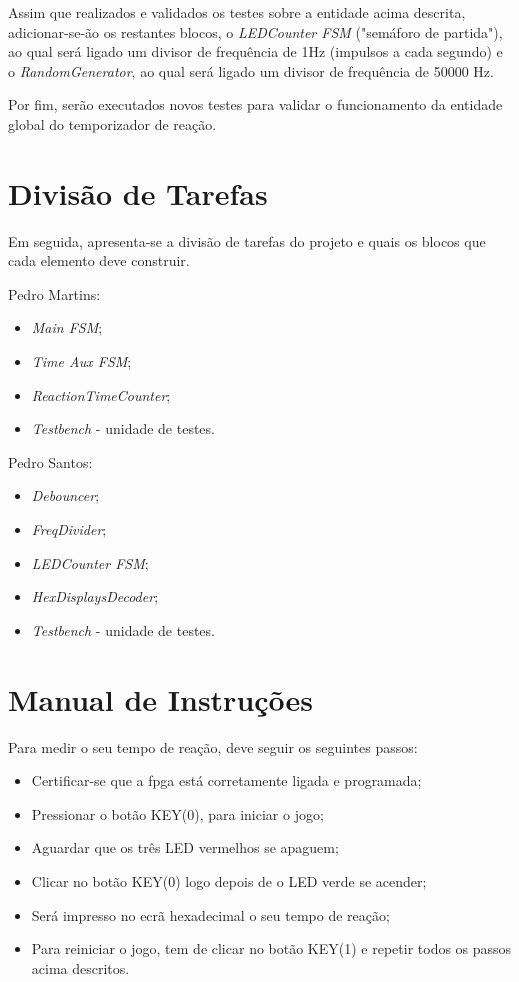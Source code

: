 \documentclass[a4paper,11pt,onecolumn]{report}
\begin{document}
Assim que realizados e validados os testes sobre a entidade acima descrita, adicionar-se-ão os restantes blocos, o \textit{LEDCounter FSM} ("semáforo de partida"), ao qual será ligado um divisor de frequência de 1Hz (impulsos a cada segundo) e o \textit{RandomGenerator}, ao qual será ligado um divisor de frequência de 50000 Hz.

Por fim, serão executados novos testes para validar o funcionamento da entidade global do temporizador de reação.

\section{Divisão de Tarefas}
Em seguida, apresenta-se a divisão de tarefas do projeto e quais os blocos que cada elemento deve construir.

Pedro Martins:
\begin{itemize}
\item \textit{Main FSM};
\item \textit{Time Aux FSM};
\item \textit{ReactionTimeCounter};
\item \textit{Testbench} - unidade de testes.
\end{itemize}

\pagebreak

Pedro Santos:
\begin{itemize}
\item \textit{Debouncer};
\item \textit{FreqDivider};
\item \textit{LEDCounter FSM};
\item \textit{HexDisplaysDecoder};
\item \textit{Testbench} - unidade de testes.
\end{itemize}

\section{Manual de Instruções}
Para medir o seu tempo de reação, deve seguir os seguintes passos:
\begin{itemize}
\item Certificar-se que a \ac{fpga} está corretamente ligada e programada;
\item Pressionar o botão KEY(0), para iniciar o jogo;
\item Aguardar que os três LED vermelhos se apaguem;
\item Clicar no botão KEY(0) logo depois de o LED verde se acender;
\item Será impresso no ecrã hexadecimal o seu tempo de reação;
\item Para reiniciar o jogo, tem de clicar no botão KEY(1) e repetir todos os passos acima descritos.
\end{itemize}
\end{document}

